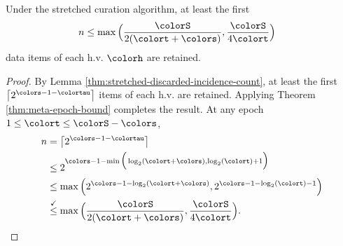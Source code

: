 \begin{theorem}
\label{thm:stretched-reservation-count}
Under the stretched curation algorithm, at least the first
\begin{align*}
n &\leq
\max\Big(
  \frac{\colorS}{2(\colort + \colors)},
  \frac{\colorS}{4\colort}
\Big)
\end{align*}
data items of each h.v. $\colorh$ are retained.
\end{theorem}
\begin{proof}

By Lemma \ref{thm:stretched-discarded-incidence-count}, at least the first $\left\lceil 2^{\colors - 1 - \colortau} \right\rceil$ items of each h.v. are retained.
Applying Theorem \ref{thm:meta-epoch-bound} completes the result.
At any epoch $1 \leq \colort \leq \colorS - \colors$,
\begin{align*}
n
&= \left\lceil 2^{\colors - 1 - \colortau} \right\rceil\\
&\leq2^{\colors - 1 - \min\Big(
  \log_2(\colort + \colors),
  \log_2(\colort) + 1
\Big)}\\
&\leq \max\Big(
  2^{\colors - 1 - \log_2(\colort + \colors)},
  2^{\colors - 1 - \log_2(\colort) - 1}
\Big)\\
&\stackrel{\checkmark}{\leq} \max\Big(
  \frac{\colorS}{2(\colort + \colors)},
  \frac{\colorS}{4\colort}
\Big).
\end{align*}

\end{proof}
